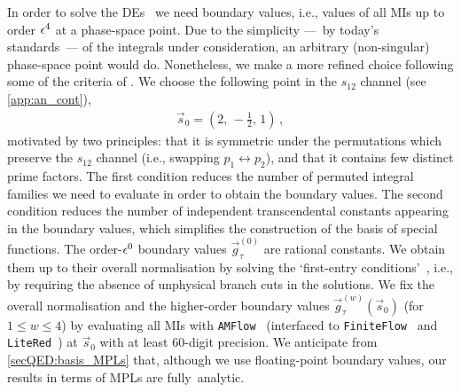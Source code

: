 \documentclass[main.tex]{subfiles}
\begin{document}
In order to solve the \acp{DE}~ we need boundary values, i.e., values of all \acp{MI} up to order $\epsilon^4$ at a phase-space point. 
Due to the simplicity ---~by today's standards~--- of the integrals under consideration, an arbitrary (non-singular) phase-space point would do. 
Nonetheless, we make a more refined choice following some of the criteria of .
We choose the following point in the $s_{12}$ channel (see \cref{app:an_cont}),
\begin{align} \label{eqQED:s0}
\vec{s}_0 = \left( 2, \, -\frac{1}{2}, \, 1 \right) \,,
\end{align}
motivated by two principles: that it is symmetric under the permutations which preserve the $s_{12}$ channel (i.e., swapping $p_1 \leftrightarrow p_2$), and that it contains few distinct prime factors.
The first condition reduces the number of permuted integral families we need to evaluate in order to obtain the boundary values.
The second condition reduces the number of independent transcendental constants appearing in the boundary values, which simplifies the construction of the basis of special functions. 
The order-$\epsilon^0$ boundary values $\vec{g}_{\tau}^{(0)}$ are rational constants. We obtain them up to their overall normalisation by solving the `first-entry conditions'~\cite{Gaiotto:2011dt}, i.e., by requiring the absence of unphysical branch cuts in the solutions. We fix the overall normalisation and the higher-order boundary values $\vec{g}_{\tau}^{(w)}(\vec{s}_0)$ (for $1\le w\le 4$) by evaluating all \acp{MI} with \texttt{AMFlow}~\cite{Liu:2022chg} (interfaced to 
\texttt{FiniteFlow}~\cite{Peraro:2019svx} and \texttt{LiteRed}~\cite{Lee:2012cn}) at $\vec{s}_0$ with at least $60$-digit precision.
We anticipate from \cref{secQED:basis_MPLs} that, although we use floating-point boundary values, our results in terms of \acp{MPL} are fully~analytic. 
\end{document}

